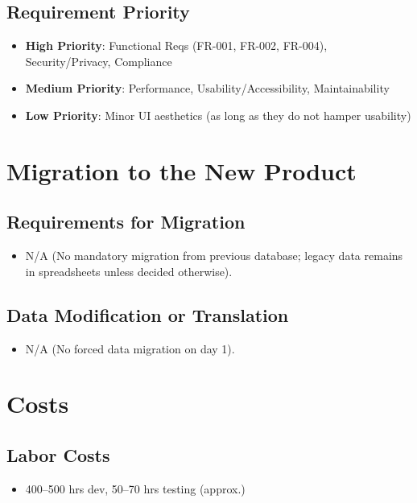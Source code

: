 \documentclass[12pt]{article}
\begin{document}
\subsection{Requirement Priority}
\begin{itemize}
    \item \textbf{High Priority}: Functional Reqs (FR-001, FR-002, FR-004), Security/Privacy, Compliance
    \item \textbf{Medium Priority}: Performance, Usability/Accessibility, Maintainability
    \item \textbf{Low Priority}: Minor UI aesthetics (as long as they do not hamper usability)
\end{itemize}

\section{Migration to the New Product}
\subsection{Requirements for Migration}
\begin{itemize}
  \item N/A (No mandatory migration from previous database; legacy data remains in spreadsheets unless decided otherwise).
\end{itemize}

\subsection{Data Modification or Translation}
\begin{itemize}
  \item N/A (No forced data migration on day 1).
\end{itemize}

\section{Costs}
\subsection{Labor Costs}
\begin{itemize}
  \item 400--500 hrs dev, 50--70 hrs testing (approx.)
\end{itemize}
\end{document}
